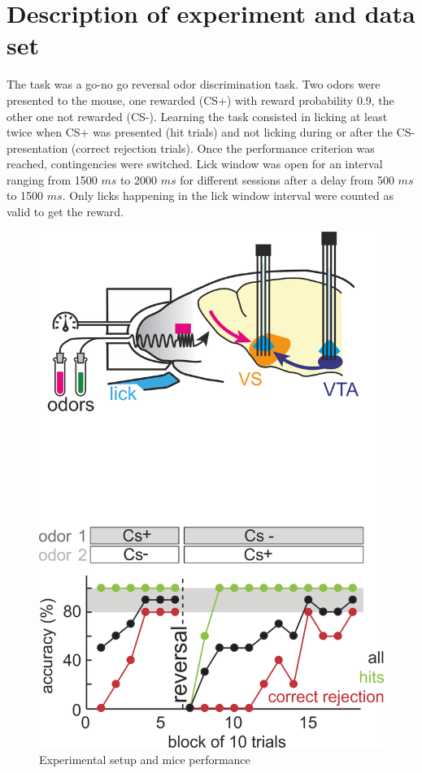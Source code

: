 \section{Description of experiment and data set}
The task was a go-no go reversal odor discrimination task. Two odors were presented to the mouse, one rewarded (CS+) with reward probability 0.9, the other one not rewarded (CS-). Learning the task consisted in licking at least twice when CS+ was presented (hit trials) and not licking during or after the CS- presentation (correct rejection trials). Once the performance criterion was reached, contingencies were switched. Lick window was open for an interval ranging from 1500 $ms$ to 2000 $ms$ for different sessions after a delay from 500 $ms$ to 1500 $ms$. Only licks happening in the lick window interval were counted as valid to get the reward.
\begin{figure}
    \centering
    \includegraphics[scale=0.3]{figures/experiment.png}
    \caption{Experimental setup and mice performance}
    \label{fig:experiment}
\end{figure}
